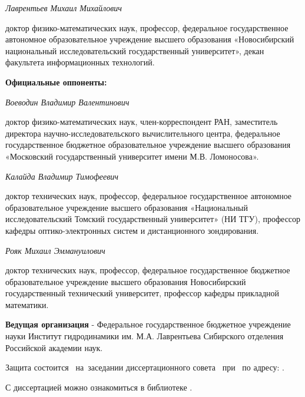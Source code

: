 \textit{Лаврентьев Михаил Михайлович}

доктор физико-математических наук, профессор, федеральное государственное автономное образовательное учреждение высшего образования «Новосибирский национальный исследовательский государственный университет», декан факультета информационных технологий.

\vspace{0.004\paperheight plus1fill}
\noindent%

\textbf{Официальные оппоненты:}

\textit{Воеводин Владимир Валентинович}

доктор физико-математических наук, член-корреспондент РАН,
заместитель директора научно-исследовательского вычислительного центра, федеральное государственное бюджетное образовательное учреждение высшего образования «Московский государственный университет имени
М.В. Ломоносова».

\vspace{0.004\paperheight plus1fill}
\textit{Калайда Владимир Тимофеевич}

доктор технических наук, профессор, федеральное государственное автономное
образовательное учреждение высшего образования «Национальный
исследовательский Томский государственный университет» (НИ ТГУ),
профессор кафедры оптико-электронных систем и дистанционного
зондирования.

\vspace{0.004\paperheight plus1fill}
\textit{Рояк Михаил Эммануилович}

доктор технических наук, профессор, федеральное государственное бюджетное образовательное учреждение высшего образования Новосибирский государственный технический университет, профессор кафедры прикладной математики.

\vspace{0.004\paperheight plus1fill}
\textbf{Ведущая организация} - Федеральное государственное бюджетное учреждение науки Институт гидродинамики им. М.А. Лаврентьева Сибирского отделения Российской академии наук.


\vspace{0.004\paperheight plus1fill}

\noindent Защита состоится ~на~заседании диссертационного совета ~при ~по адресу: .

\vspace{0.004\paperheight plus1fill}
\noindent С диссертацией можно ознакомиться в библиотеке \synopsisLibrary.

